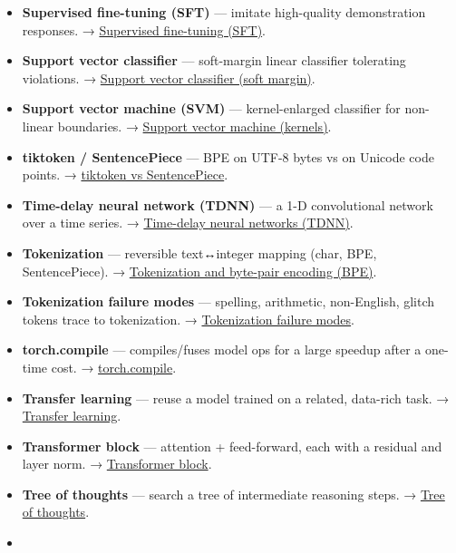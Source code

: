 \documentclass[
  10pt,
  letterpaper,
  onecolumn]{article}
\begin{document}
\begin{itemize}
  \protect\hyperlink{random-sampling-methods-simple-stratified-weighted-reservoir}{Random
  sampling methods (simple, stratified, weighted, reservoir)}.
\item
  \textbf{Supervised fine-tuning (SFT)} --- imitate high-quality
  demonstration responses. →
  \protect\hyperlink{supervised-fine-tuning-sft}{Supervised fine-tuning
  (SFT)}.
\item
  \textbf{Support vector classifier} --- soft-margin linear classifier
  tolerating violations. →
  \protect\hyperlink{support-vector-classifier-soft-margin}{Support
  vector classifier (soft margin)}.
\item
  \textbf{Support vector machine (SVM)} --- kernel-enlarged classifier
  for non-linear boundaries. →
  \protect\hyperlink{support-vector-machine-kernels}{Support vector
  machine (kernels)}.
\item
  \textbf{tiktoken / SentencePiece} --- BPE on UTF-8 bytes vs on Unicode
  code points. → \protect\hyperlink{tiktoken-vs-sentencepiece}{tiktoken
  vs SentencePiece}.
\item
  \textbf{Time-delay neural network (TDNN)} --- a 1-D convolutional
  network over a time series. →
  \protect\hyperlink{time-delay-neural-networks-tdnn}{Time-delay neural
  networks (TDNN)}.
\item
  \textbf{Tokenization} --- reversible text↔integer mapping (char, BPE,
  SentencePiece). →
  \protect\hyperlink{tokenization-and-byte-pair-encoding-bpe}{Tokenization
  and byte-pair encoding (BPE)}.
\item
  \textbf{Tokenization failure modes} --- spelling, arithmetic,
  non-English, glitch tokens trace to tokenization. →
  \protect\hyperlink{tokenization-failure-modes}{Tokenization failure
  modes}.
\item
  \textbf{torch.compile} --- compiles/fuses model ops for a large
  speedup after a one-time cost. →
  \protect\hyperlink{torch.compile}{torch.compile}.
\item
  \textbf{Transfer learning} --- reuse a model trained on a related,
  data-rich task. → \protect\hyperlink{transfer-learning}{Transfer
  learning}.
\item
  \textbf{Transformer block} --- attention + feed-forward, each with a
  residual and layer norm. →
  \protect\hyperlink{transformer-block}{Transformer block}.
\item
  \textbf{Tree of thoughts} --- search a tree of intermediate reasoning
  steps. → \protect\hyperlink{tree-of-thoughts}{Tree of thoughts}.
\item

\end{itemize}
\end{document}
